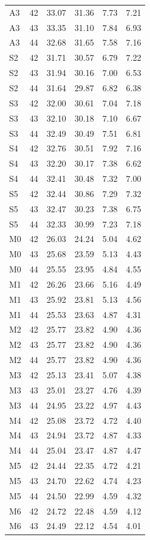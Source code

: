 \documentclass[12pt,a4paper]{report}
\begin{document}
\begin{longtable}{lrrrrr}
A3 & 42 & 33.07 & 31.36 & 7.73 & 7.21 \\
A3 & 43 & 33.35 & 31.10 & 7.84 & 6.93 \\
A3 & 44 & 32.68 & 31.65 & 7.58 & 7.16 \\
S2 & 42 & 31.71 & 30.57 & 6.79 & 7.22 \\
S2 & 43 & 31.94 & 30.16 & 7.00 & 6.53 \\
S2 & 44 & 31.64 & 29.87 & 6.82 & 6.38 \\
S3 & 42 & 32.00 & 30.61 & 7.04 & 7.18 \\
S3 & 43 & 32.10 & 30.18 & 7.10 & 6.67 \\
S3 & 44 & 32.49 & 30.49 & 7.51 & 6.81 \\
S4 & 42 & 32.76 & 30.51 & 7.92 & 7.16 \\
S4 & 43 & 32.20 & 30.17 & 7.38 & 6.62 \\
S4 & 44 & 32.41 & 30.48 & 7.32 & 7.00 \\
S5 & 42 & 32.44 & 30.86 & 7.29 & 7.32 \\
S5 & 43 & 32.47 & 30.23 & 7.38 & 6.75 \\
S5 & 44 & 32.33 & 30.99 & 7.23 & 7.18 \\
M0 & 42 & 26.03 & 24.24 & 5.04 & 4.62 \\
M0 & 43 & 25.68 & 23.59 & 5.13 & 4.43 \\
M0 & 44 & 25.55 & 23.95 & 4.84 & 4.55 \\
M1 & 42 & 26.26 & 23.66 & 5.16 & 4.49 \\
M1 & 43 & 25.92 & 23.81 & 5.13 & 4.56 \\
M1 & 44 & 25.53 & 23.63 & 4.87 & 4.31 \\
M2 & 42 & 25.77 & 23.82 & 4.90 & 4.36 \\
M2 & 43 & 25.77 & 23.82 & 4.90 & 4.36 \\
M2 & 44 & 25.77 & 23.82 & 4.90 & 4.36 \\
M3 & 42 & 25.13 & 23.41 & 5.07 & 4.38 \\
M3 & 43 & 25.01 & 23.27 & 4.76 & 4.39 \\
M3 & 44 & 24.95 & 23.22 & 4.97 & 4.43 \\
M4 & 42 & 25.08 & 23.72 & 4.72 & 4.40 \\
M4 & 43 & 24.94 & 23.72 & 4.87 & 4.33 \\
M4 & 44 & 25.04 & 23.47 & 4.87 & 4.47 \\
M5 & 42 & 24.44 & 22.35 & 4.72 & 4.21 \\
M5 & 43 & 24.70 & 22.62 & 4.74 & 4.23 \\
M5 & 44 & 24.50 & 22.99 & 4.59 & 4.32 \\
M6 & 42 & 24.72 & 22.48 & 4.59 & 4.12 \\
M6 & 43 & 24.49 & 22.12 & 4.54 & 4.01 \\
\end{longtable}
\normalsize
\end{document}
